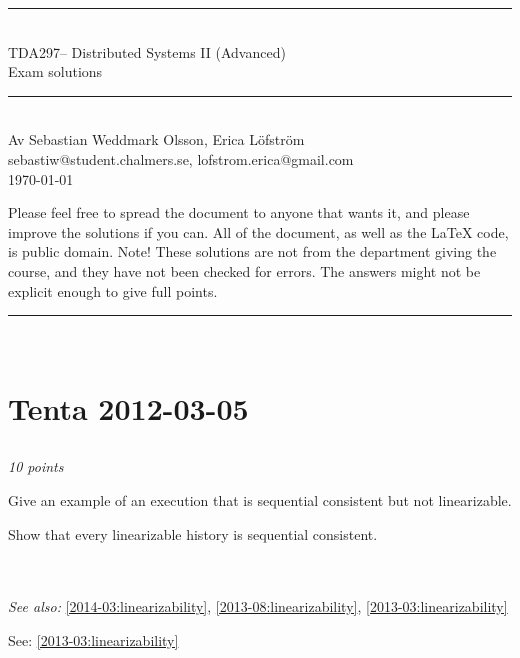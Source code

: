 \documentclass[a4paper]{article}
\makeatletter
\newcommand{\coursecode}{TDA297}
\newcommand{\coursename}{Distributed Systems II (Advanced)}
\newcommand{\authorname}{Sebastian Weddmark Olsson, Erica Löfström}
\newcommand{\authormail}{sebastiw@student.chalmers.se, lofstrom.erica@gmail.com}
\newcommand{\doctitle}{Exam solutions}
\newcommand{\horrule}[1]{\rule{\linewidth}{#1}} %
\newcommand{\points}[1]{\subsection{} \textit{#1 points}\\}
\newcommand{\question}[2][]{
  \parbox[t]{\textwidth}{
    \ifthenelse{\equal{#1}{}}{}{#1)}
    \parbox[t]{0.95\textwidth}{#2}}\\}
\newcommand{\seealso}[1]{\\\textit{See also:} #1}
\newcommand{\solution}[2][]{
  \ifthenelse{\equal{#1}{} \or \equal{#1}{a}}{\\[3pt]\textit{Solution: }\\[0.1cm]}{}
  \parbox[t]{\textwidth}{
    \ifthenelse{\equal{#1}{}}{}{#1)}
    \parbox[t]{0.95\textwidth}{#2}}\\
}
\makeatother
\begin{document}
\thispagestyle{plain} %
\begin{center}
\horrule{0.5pt} \\[0.3cm] %
%
\huge \coursecode -- \coursename \\[1mm]
\Large \doctitle \\
\normalsize %
\horrule{2pt} \\[0.1cm] %
Av \authorname \\
\authormail\\[0.1cm]
\footnotesize \today\\[0.4cm]
\end{center}
{\footnotesize
Please feel free to spread the document to anyone that wants it, and
please improve the solutions if you can. All of the document, as well
as the \LaTeX{} code, is public domain.
Note! These solutions are not from the department giving the course,
and they have not been checked for errors. The answers might not be
explicit enough to give full points.\\
}
\horrule{0.5pt} %
\normalsize %
\\

\section{Tenta 2012-03-05}

\points{10}
\question{
  Give an example of an execution that is sequential consistent but
  not linearizable.

  Show that every linearizable history is sequential consistent.
}
\seealso{\ref{2014-03:linearizability}, \ref{2013-08:linearizability}, \ref{2013-03:linearizability}}
\solution{See: \ref{2013-03:linearizability}}
\end{document}
